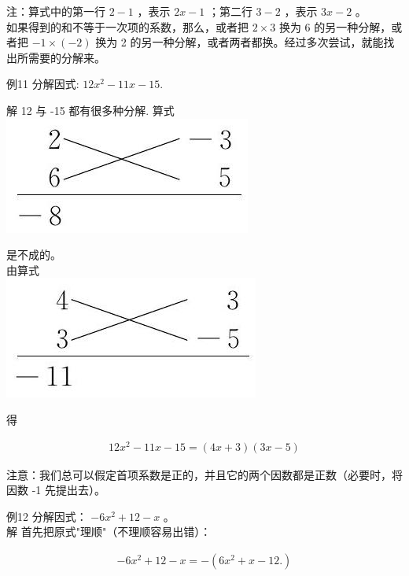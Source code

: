 \documentclass[10pt]{article}
\begin{document}
注：算式中的第一行 $2-1$ ，表示 $2 x-1$ ；第二行 $3-2$ ，表示 $3 x-2$ 。\\
如果得到的和不等于一次项的系数，那么，或者把 $2 \times 3$ 换为 6 的另一种分解，或者把 $-1 \times(-2)$ 换为 2 的另一种分解，或者两者都换。经过多次尝试，就能找出所需要的分解来。

例11 分解因式: $12 x^{2}-11 x-15$.

解 12 与 -15 都有很多种分解. 算式\\
\includegraphics[max width=\textwidth, center]{2024_10_30_bd799899fef40368a068g-038(2)}

是不成的。\\
由算式\\
\includegraphics[max width=\textwidth, center]{2024_10_30_bd799899fef40368a068g-038}

得

\begin{align*}
12 x^{2}-11 x-15=(4 x+3)(3 x-5)
\end{align*}

注意：我们总可以假定首项系数是正的，并且它的两个因数都是正数（必要时，将因数 -1 先提出去）。

例12 分解因式： $-6 x^{2}+12-x$ 。\\
解 首先把原式"理顺"（不理顺容易出错）：

\begin{align*}
-6 x^{2}+12-x=-\left(6 x^{2}+x-12 .\right)
\end{align*}
\end{document}
